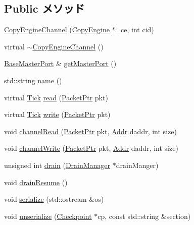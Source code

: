 \subsection*{Public メソッド}
\begin{DoxyCompactItemize}
\item 
\hyperlink{classCopyEngine_1_1CopyEngineChannel_a407c12791405657ab18510c2141828fe}{CopyEngineChannel} (\hyperlink{classCopyEngine_1_1CopyEngine}{CopyEngine} $\ast$\_\-ce, int cid)
\item 
virtual \hyperlink{classCopyEngine_1_1CopyEngineChannel_a9d13764944deaf17eb431f30157545ca}{$\sim$CopyEngineChannel} ()
\item 
\hyperlink{classBaseMasterPort}{BaseMasterPort} \& \hyperlink{classCopyEngine_1_1CopyEngineChannel_a4e826c60c407af047c6cfdcba5f79467}{getMasterPort} ()
\item 
std::string \hyperlink{classCopyEngine_1_1CopyEngineChannel_af1801e31af6399bccce114ab12575168}{name} ()
\item 
virtual \hyperlink{base_2types_8hh_a5c8ed81b7d238c9083e1037ba6d61643}{Tick} \hyperlink{classCopyEngine_1_1CopyEngineChannel_a3848226950f14efe17b2b251384cde95}{read} (\hyperlink{classPacket}{PacketPtr} pkt)
\item 
virtual \hyperlink{base_2types_8hh_a5c8ed81b7d238c9083e1037ba6d61643}{Tick} \hyperlink{classCopyEngine_1_1CopyEngineChannel_aeda092863c7ed5e4523d9b705d0d8c15}{write} (\hyperlink{classPacket}{PacketPtr} pkt)
\item 
void \hyperlink{classCopyEngine_1_1CopyEngineChannel_a0d7e053ca25cc1b216632397c95161b7}{channelRead} (\hyperlink{classPacket}{PacketPtr} pkt, \hyperlink{base_2types_8hh_af1bb03d6a4ee096394a6749f0a169232}{Addr} daddr, int size)
\item 
void \hyperlink{classCopyEngine_1_1CopyEngineChannel_a2ba2036c031e913ac61e918218159eaa}{channelWrite} (\hyperlink{classPacket}{PacketPtr} pkt, \hyperlink{base_2types_8hh_af1bb03d6a4ee096394a6749f0a169232}{Addr} daddr, int size)
\item 
unsigned int \hyperlink{classCopyEngine_1_1CopyEngineChannel_a6bf479c521c7c3eb473822d953275b26}{drain} (\hyperlink{classDrainManager}{DrainManager} $\ast$drainManger)
\item 
void \hyperlink{classCopyEngine_1_1CopyEngineChannel_a8f020d3237536fe007fc488c4125c5d8}{drainResume} ()
\item 
void \hyperlink{classCopyEngine_1_1CopyEngineChannel_a53e036786d17361be4c7320d39c99b84}{serialize} (std::ostream \&os)
\item 
void \hyperlink{classCopyEngine_1_1CopyEngineChannel_af22e5d6d660b97db37003ac61ac4ee49}{unserialize} (\hyperlink{classCheckpoint}{Checkpoint} $\ast$cp, const std::string \&section)
\end{DoxyCompactItemize}
